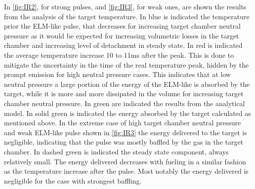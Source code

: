 In \autoref{fig:IR2}, for strong pulses, and \autoref{fig:IR3}, for weak ones, are shown the results from the analysis of the target temperature. In blue is indicated the temperature prior the ELM-like pulse, that decreases for increasing target chamber neutral pressure as it would be expected for increasing volumetric losses in the target chamber and increasing level of detachment in steady state. In red is indicated the average temperature increase 10 to 11ms after the peak. This is done to mitigate the uncertainty in the time of the real temperature peak, hidden by the prompt emission for high neutral pressure cases. This indicates that at low neutral pressure a large portion of the energy of the ELM-like is absorbed by the target, while it is more and more dissipated in the volume for increasing target chamber neutral pressure. In green are indicated the results from the analytical model. In solid green is indicated the energy absorbed by the target calculated as mentioned above. In the extreme case of high target chamber neutral pressure and weak ELM-like pulse shown in \autoref{fig:IR3} the energy delivered to the target is negligible, indicating that the pulse was mostly baffled by the gas in the target chamber. In dashed green is indicated the steady state component, always relatively small. The energy delivered decreases with fueling in a similar fashion as the temperature increase after the pulse. Most notably the energy delivered is negligible for the case with strongest baffling.

